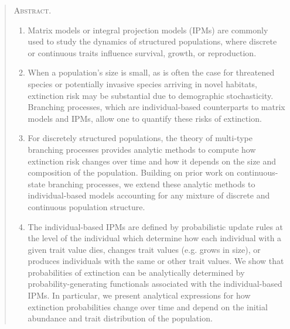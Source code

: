\documentclass[12pt]{amsart}\usepackage[]{graphicx}\usepackage[]{color}
\begin{document}
\begin{quote}
\textsc{Abstract.}
\begin{enumerate}\linenumbers
\item  Matrix models or integral projection models (IPMs) are commonly used to study the dynamics of structured populations, where discrete or continuous traits influence survival, growth, or reproduction.

\item When a population's size is small, as is often the case for threatened species or potentially invasive species arriving in novel habitats, extinction risk may be substantial due to demographic stochasticity. Branching processes, which are individual-based counterparts to matrix models and IPMs, allow one to quantify these risks of extinction.

\item For discretely structured populations, the theory of multi-type branching processes provides analytic methods to compute how extinction risk changes over time and how it depends on the size and composition of the population. Building on prior work on continuous-state branching processes, we extend these analytic methods to individual-based models accounting for any mixture of discrete and continuous population structure.

\item The individual-based IPMs are defined by probabilistic update rules at the level of the individual which determine how each individual with a given trait value dies, changes trait values (e.g. grows in size), or produces individuals with the same or other trait values.  We show that probabilities of extinction can be analytically determined by probability-generating functionals associated with the individual-based IPMs. In particular, we present analytical expressions for how extinction probabilities change over time and depend on the initial abundance and trait distribution of the population.


\end{enumerate}
\end{quote}
\end{document}
